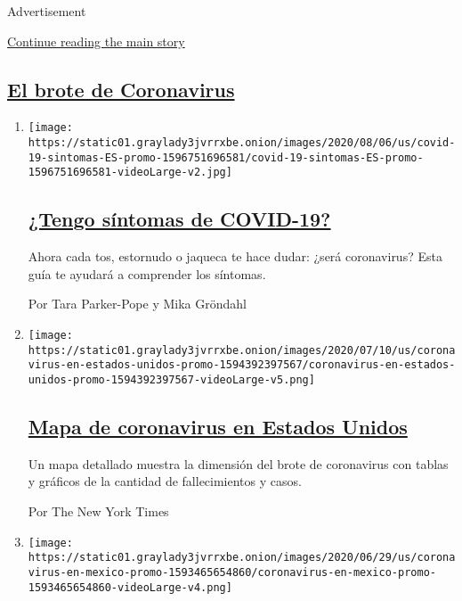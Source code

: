 Advertisement

\protect\hyperlink{after-mid2}{Continue reading the main story}

\hypertarget{el-brote-de-coronavirus}{%
\subsection{\texorpdfstring{\protect\hyperlink{}{El brote de
Coronavirus}}{El brote de Coronavirus}}\label{el-brote-de-coronavirus}}

\begin{enumerate}
\def\labelenumi{\arabic{enumi}.}
\item
  \texttt{[image: https://static01.graylady3jvrrxbe.onion/images/2020/08/06/us/covid-19-sintomas-ES-promo-1596751696581/covid-19-sintomas-ES-promo-1596751696581-videoLarge-v2.jpg]}

  \hypertarget{tengo-suxedntomas-de-covid-19}{%
  \subsection{\texorpdfstring{\href{/es/interactive/2020/08/06/espanol/ciencia-y-tecnologia/tengo-covid-19-sintomas.html}{¿Tengo
  síntomas de
  COVID-19?}}{¿Tengo síntomas de COVID-19?}}\label{tengo-suxedntomas-de-covid-19}}

  Ahora cada tos, estornudo o jaqueca te hace dudar: ¿será coronavirus?
  Esta guía te ayudará a comprender los síntomas.

  Por Tara Parker-Pope y Mika Gröndahl
\item
  \texttt{[image: https://static01.graylady3jvrrxbe.onion/images/2020/07/10/us/coronavirus-en-estados-unidos-promo-1594392397567/coronavirus-en-estados-unidos-promo-1594392397567-videoLarge-v5.png]}

  \hypertarget{mapa-de-coronavirus-en-estados-unidos}{%
  \subsection{\texorpdfstring{\href{/es/interactive/2020/espanol/mundo/coronavirus-en-estados-unidos.html}{Mapa
  de coronavirus en Estados
  Unidos}}{Mapa de coronavirus en Estados Unidos}}\label{mapa-de-coronavirus-en-estados-unidos}}

  Un mapa detallado muestra la dimensión del brote de coronavirus con
  tablas y gráficos de la cantidad de fallecimientos y casos.

  Por The New York Times
\item
  \texttt{[image: https://static01.graylady3jvrrxbe.onion/images/2020/06/29/us/coronavirus-en-mexico-promo-1593465654860/coronavirus-en-mexico-promo-1593465654860-videoLarge-v4.png]}


\end{enumerate}
